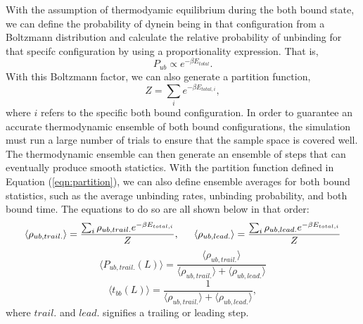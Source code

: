 With the assumption of thermodyamic equilibrium during the both bound state, we can define the probability of dynein being in that configuration from a Boltzmann distribution and calculate the relative probability of unbinding for that specifc configuration by using a proportionality expression. That is, 
\begin{equation}
	P_{ub}\propto e^{-\beta E_{total}}.
\end{equation}
With this Boltzmann factor, we can also generate a partition function, 
\begin{equation} \label{eqn:partition}
	Z=\sum_{i}e^{-\beta E_{total,i}},
\end{equation}
where $i$ refers to the specific both bound configuration. In order to guarantee an accurate thermodynamic ensemble of both bound configurations, the simulation must run a large number of trials to ensure that the sample space is covered well. The thermodynamic ensemble can then generate an ensemble of steps that can eventually produce smooth statictics. With the partition function defined in Equation (\ref{eqn:partition}), we can also define ensemble averages for both bound statistics, such as the average unbinding rates, unbinding probability, and both bound time. The equations to do so are all shown below in that order:
\begin{equation}
	\langle\rho_{ub, trail.}\rangle=\frac{\sum_{i}\rho_{ub, trail.} e^{-\beta E_{total,i}}}{Z}, \indent \langle\rho_{ub, lead.}\rangle=\frac{\sum_{i}\rho_{ub, lead.} e^{-\beta E_{total,i}}}{Z}
\end{equation}
\begin{equation} \label{eqn:ProbTrail}
	\langle P_{ub, trail.}(L)\rangle = \frac{\langle\rho_{ub, trail.}\rangle}{\langle\rho_{ub, trail.}\rangle + \langle\rho_{ub, lead.}\rangle}
\end{equation}
\begin{equation}
	\langle t_{bb}(L) \rangle =\frac{1}{\langle\rho_{ub, trail.}\rangle + \langle\rho_{ub, lead.}\rangle},
\end{equation}
where $trail.$ and $lead.$ signifies a trailing or leading step.




